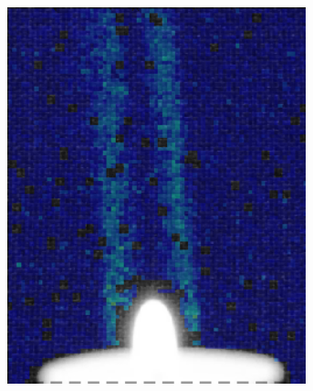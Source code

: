 \documentclass[letterpaper,12pt]{article}
\begin{document}
\begin{figure}[h]
    \centering
    \begin{subfigure}[b]{0.3\textwidth}
    	\centering
        \includegraphics[width=0.95\textwidth]{Candle_Auto_Colormap.PNG}
        \caption{}
        \label{fig:Candle_Auto_Colormap}
    \end{subfigure}
    \begin{subfigure}[b]{0.3\textwidth}
    	\centering

\end{subfigure}
\end{figure}
\end{document}
